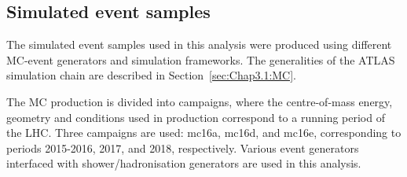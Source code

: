 \subsection{Simulated event samples}
\label{sec:ChaptH:Data_and_MC:MC}
The simulated event samples used in this analysis were produced using 
different MC-event generators and simulation frameworks. 
The generalities of the ATLAS simulation chain are described in 
Section~\ref{sec:Chap3.1:MC}.

The MC production is divided into campaigns, where the centre-of-mass energy,
geometry and conditions used in production correspond to a running period of
the LHC.  Three campaigns are used: mc16a, mc16d, and mc16e, corresponding to periods 2015-2016, 2017, and 2018, respectively.
Various event generators interfaced with shower/hadronisation generators are used in this analysis. 


\begin{comment} %
After the event generation, the trigger and detector simulation are 
performed using the Athena.
The detector simulation is carried out either using the GEANT4 framework~\cite{GEANT4:2002zbu} 
for a detailed physics description or the \texttt{Atlfast2}~\cite{SOFT-2010-01} framework for 
faster simulation. The AFII strategy is used for the ATLAS
calorimeters, while GEANT4 is used for the rest of the simulation. 


The \pileup effect, is incorporated by overlaying the hard-scattering event 
with inelastic \pp\ events generated using \PYTHIA[8.186]~\cite{Sjostrand:2007gs}. 
The ATLAS third set of tuned parameters for minimum-bias events (A3 tune~\cite{ATL-PHYS-PUB-2016-017}) 
and the \NNPDF[2.3lo] set of PDFs~\cite{Ball:2012cx} are employed for the \pileup modelling.
\end{comment}


